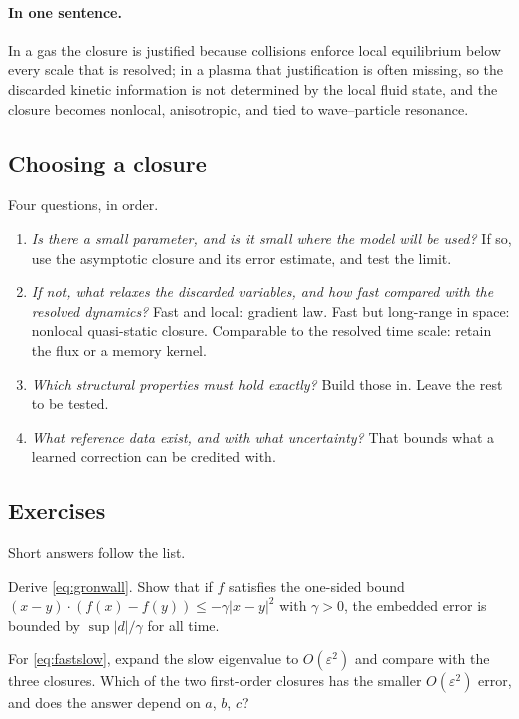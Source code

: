 \paragraph{In one sentence.} In a gas the closure is justified because
collisions enforce local equilibrium below every scale that is resolved; in
a plasma that justification is often missing, so the discarded kinetic
information is not determined by the local fluid state, and the closure
becomes nonlocal, anisotropic, and tied to wave--particle resonance.

\subsection{Choosing a closure}

Four questions, in order.
\begin{enumerate}
  \item \emph{Is there a small parameter, and is it small where the model
    will be used?} If so, use the asymptotic closure and its error
    estimate, and test the limit.
  \item \emph{If not, what relaxes the discarded variables, and how fast
    compared with the resolved dynamics?} Fast and local: gradient law.
    Fast but long-range in space: nonlocal quasi-static closure.
    Comparable to the resolved time scale: retain the flux or a memory
    kernel.
  \item \emph{Which structural properties must hold exactly?} Build those
    in. Leave the rest to be tested.
  \item \emph{What reference data exist, and with what uncertainty?} That
    bounds what a learned correction can be credited with.
\end{enumerate}

\subsection{Exercises}

Short answers follow the list.

\begin{exercise}\label{ex:gron}
Derive \eqref{eq:gronwall}. Show that if $f$ satisfies the one-sided bound
$(x-y)\cdot(f(x)-f(y))\le-\gamma|x-y|^2$ with $\gamma>0$, the embedded error
is bounded by $\sup|d|/\gamma$ for all time.
\end{exercise}

\begin{exercise}
For \eqref{eq:fastslow}, expand the slow eigenvalue to $O(\varepsilon^2)$
and compare with the three closures. Which of the two first-order closures
has the smaller $O(\varepsilon^2)$ error, and does the answer depend on
$a$, $b$, $c$?
\end{exercise}

